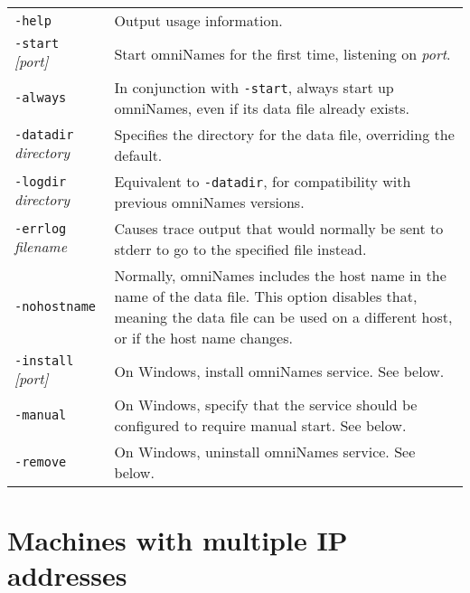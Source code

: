 \documentclass[a4paper,11pt]{article}
\newcommand{\cmdline}[1]{\texttt{#1}}
\begin{document}
\noindent\begin{tabular}{lp{}}

\cmdline{-help} &
    Output usage information.\\[.5\baselineskip]

\cmdline{-start }\textit{[port]} &
    Start omniNames for the first time, listening on
    \textit{port}.\\[.5\baselineskip]

\cmdline{-always} &
    In conjunction with \cmdline{-start}, always start up
    omniNames, even if its data file already exists.\\[.5\baselineskip]

\cmdline{-datadir }\textit{directory} &
    Specifies the directory for the data file, overriding the
    default.\\[.5\baselineskip]

\cmdline{-logdir }\textit{directory} &
    Equivalent to \cmdline{-datadir}, for compatibility with previous
    omniNames versions.\\[.5\baselineskip]

\cmdline{-errlog }\textit{filename} &
    Causes trace output that would normally be sent to stderr to go to the
    specified file instead.\\[.5\baselineskip]

\cmdline{-nohostname} &
    Normally, omniNames includes the host name in the name of the data
    file. This option disables that, meaning the data file can be used
    on a different host, or if the host name changes.\\[.5\baselineskip]

\cmdline{-install }\textit{[port]} &
    On Windows, install omniNames service. See below.\\[.5\baselineskip]

\cmdline{-manual} &
    On Windows, specify that the service should be configured to
    require manual start. See below.\\[.5\baselineskip]

\cmdline{-remove} &
    On Windows, uninstall omniNames service. See below.\\[.5\baselineskip]

\end{tabular}


\section{Machines with multiple IP addresses}
\end{document}
